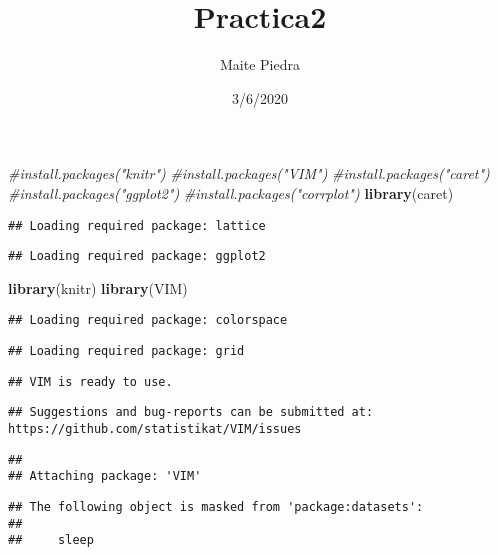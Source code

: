 \documentclass[]{article}
\title{Practica2}
\author{Maite Piedra}
\date{3/6/2020}
\newenvironment{Shaded}{\begin{snugshade}}{\end{snugshade}}
\newcommand{\CommentTok}[1]{\textcolor[rgb]{0.56,0.35,0.01}{\textit{#1}}}
\newcommand{\KeywordTok}[1]{\textcolor[rgb]{0.13,0.29,0.53}{\textbf{#1}}}
\newcommand{\NormalTok}[1]{#1}
\begin{document}
\maketitle

\begin{Shaded}
\begin{Highlighting}[]
\CommentTok{#install.packages("knitr")}
\CommentTok{#install.packages("VIM")}
\CommentTok{#install.packages("caret")}
\CommentTok{#install.packages("ggplot2")}
\CommentTok{#install.packages("corrplot")}
\KeywordTok{library}\NormalTok{(caret)}
\end{Highlighting}
\end{Shaded}

\begin{verbatim}
## Loading required package: lattice
\end{verbatim}

\begin{verbatim}
## Loading required package: ggplot2
\end{verbatim}

\begin{Shaded}
\begin{Highlighting}[]
\KeywordTok{library}\NormalTok{(knitr)}
\KeywordTok{library}\NormalTok{(VIM)}
\end{Highlighting}
\end{Shaded}

\begin{verbatim}
## Loading required package: colorspace
\end{verbatim}

\begin{verbatim}
## Loading required package: grid
\end{verbatim}

\begin{verbatim}
## VIM is ready to use.
\end{verbatim}

\begin{verbatim}
## Suggestions and bug-reports can be submitted at: https://github.com/statistikat/VIM/issues
\end{verbatim}

\begin{verbatim}
## 
## Attaching package: 'VIM'
\end{verbatim}

\begin{verbatim}
## The following object is masked from 'package:datasets':
## 
##     sleep
\end{verbatim}
\end{document}
